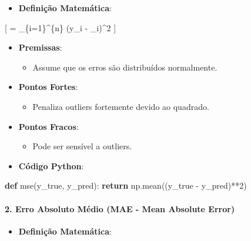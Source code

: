 \documentclass[11pt]{article}
\providecommand{\tightlist}{%
      \setlength{\itemsep}{0pt}\setlength{\parskip}{0pt}}
\newenvironment{Shaded}{}{}
\newcommand{\KeywordTok}[1]{\textcolor[rgb]{0.00,0.44,0.13}{\textbf{{#1}}}}
\newcommand{\DecValTok}[1]{\textcolor[rgb]{0.25,0.63,0.44}{{#1}}}
\newcommand{\NormalTok}[1]{{#1}}
\newcommand{\ControlFlowTok}[1]{\textcolor[rgb]{0.00,0.44,0.13}{\textbf{{#1}}}}
\newcommand{\OperatorTok}[1]{\textcolor[rgb]{0.40,0.40,0.40}{{#1}}}
\begin{document}
\begin{itemize}
\tightlist
\item
  \textbf{Definição Matemática}:
\end{itemize}

{[}  =  \sum\_\{i=1\}\^{}\{n\} (y\_i -
\_i)\^{}2 {]}

\begin{itemize}
\tightlist
\item
  \textbf{Premissas}:

  \begin{itemize}
  \tightlist
  \item
    Assume que os erros são distribuídos normalmente.
  \end{itemize}
\item
  \textbf{Pontos Fortes}:

  \begin{itemize}
  \tightlist
  \item
    Penaliza outliers fortemente devido ao quadrado.
  \end{itemize}
\item
  \textbf{Pontos Fracos}:

  \begin{itemize}
  \tightlist
  \item
    Pode ser sensível a outliers.
  \end{itemize}
\item
  \textbf{Código Python}:
\end{itemize}

\begin{Shaded}
\begin{Highlighting}[]
\KeywordTok{def}\NormalTok{ mse(y\_true, y\_pred):}
    \ControlFlowTok{return}\NormalTok{ np.mean((y\_true }\OperatorTok{{-}}\NormalTok{ y\_pred)}\OperatorTok{**}\DecValTok{2}\NormalTok{)}
\end{Highlighting}
\end{Shaded}

\hypertarget{erro-absoluto-muxe9dio-mae---mean-absolute-error}{%
\paragraph{2. Erro Absoluto Médio (MAE - Mean Absolute
Error)}\label{erro-absoluto-muxe9dio-mae---mean-absolute-error}}

\begin{itemize}
\tightlist
\item
  \textbf{Definição Matemática}:
\end{itemize}
\end{document}
